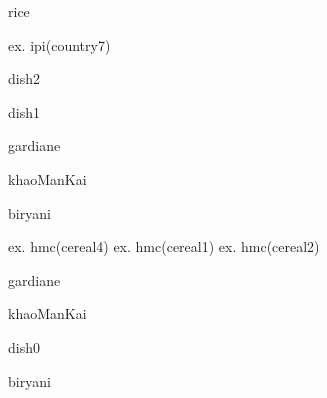 \documentclass[a4paper,portrait,12pt]{article}
\begin{document}
\begin{flushleft}
rice
\end{flushleft}


\begin{flushleft}
ex. ipi(country7)
\end{flushleft}





\begin{flushleft}
dish2
\end{flushleft}





\begin{flushleft}
dish1
\end{flushleft}





\begin{flushleft}
gardiane
\end{flushleft}


\begin{flushleft}
khaoManKai
\end{flushleft}


\begin{flushleft}
biryani
\end{flushleft}


\begin{flushleft}
ex. hmc(cereal4) ex. hmc(cereal1) ex. hmc(cereal2)
\end{flushleft}


\begin{flushleft}
gardiane
\end{flushleft}





\begin{flushleft}
khaoManKai
\end{flushleft}





\begin{flushleft}
dish0
\end{flushleft}





\begin{flushleft}
biryani
\end{flushleft}
\end{document}
